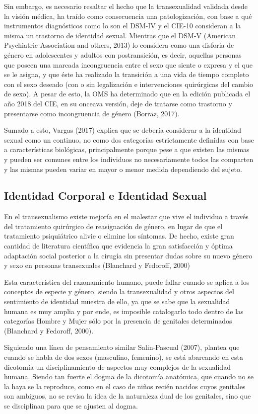 Sin embargo, es necesario resaltar el hecho que la transexualidad validada desde
la visión médica, ha traído como consecuencia una patologización, con base a qué
instrumentos diagnósticos como lo son el DSM-IV y el CIE-10 consideran a la
misma un trastorno de identidad sexual.
Mientras que el DSM-V (American Psychiatric Association and others, 2013) lo
considera como una disforia de género en adolescentes y adultos con
postransición, es decir, aquellas personas que poseen una marcada
incongruencia entre el sexo que siente o expresa y el que se le asigna, y que
éste ha realizado la transición a una vida de tiempo completo con el sexo
deseado (con o sin legalización e intervenciones quirúrgicas del cambio de
sexo).
A pesar de esto, la OMS ha determinado que en la edición publicada el año
2018 del CIE, en su onceava versión, deje de tratarse como trastorno y presentarse como incongruencia
de género (Borraz, 2017).

Sumado a esto, Vargas (2017) explica que se debería considerar a la identidad
sexual como un continuo, no como dos categorías estrictamente definidas con base
a características biológicas, principalmente porque pese a que existen las
mismas y pueden ser comunes entre los individuos no necesariamente todos las
comparten y las mismas pueden variar en mayor o menor medida dependiendo del
sujeto.

\subsection{Identidad Corporal e Identidad Sexual}
En el transexualismo existe mejoría en el malestar que vive el individuo a
través del tratamiento quirúrgico de reasignación de género, en lugar de que el
tratamiento psiquiátrico alivie o elimine los síntomas.
De hecho, existe gran cantidad de literatura científica que evidencia la gran
satisfacción y óptima adaptación social posterior a la cirugía sin presentar
dudas sobre su nuevo género y sexo en personas transexuales (Blanchard y
Fedoroff, 2000)

Esta característica del razonamiento humano, puede fallar cuando se aplica a los
conceptos de especie y género, siendo la transexualidad y otros aspectos del
sentimiento de identidad muestra de ello, ya que se sabe que la sexualidad
humana es muy amplia y por ende, es imposible catalogarlo todo dentro de las
categorías Hombre y Mujer sólo por la presencia de genitales determinados
(Blanchard y Fedoroff, 2000).

Siguiendo una línea de pensamiento similar Salin-Pascual (2007), plantea que
cuando se habla de dos sexos (masculino, femenino), se está abarcando en esta
dicotomía un disciplinamiento de aspectos muy complejos de la sexualidad humana.
Siendo tan fuerte el dogma de la dicotomía anatómica, que cuando no se la haya
se la reproduce, como en el caso de niños recién nacidos cuyos genitales son
ambiguos, no se revisa la idea de la naturaleza dual de los genitales, sino que
se disciplinan para que se ajusten al dogma.

